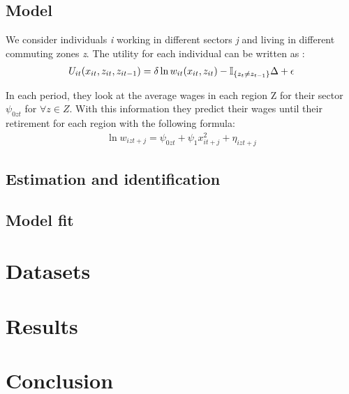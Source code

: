 \documentclass[12pt]{article}
\begin{document}
    \subsection*{Model}

    We consider individuals \textit{i} working in different sectors \textit{j} and living in different commuting
    zones \textit{z}.
    The utility for each individual can be written as :
    \begin{equation}\label{eq:utility function}
    \begin{aligned}
    U_{i t}(x_{i t}, z_{i t}, z_{i t-1}) =  & \hspace{1mm} \delta \ln w_{i t}(x_{i t}, z_{i t})- \mathbb{I}_{\{z_{t} \neq z_{t-1}\}}\Delta + \epsilon  \\
    \end{aligned}
    \end{equation}

    In each period, they look at the average wages in each region Z for their sector $\psi_{0 z t}$ for $\forall z
    \in Z$.
    With this information they predict their wages until their retirement for each region with the following formula:\\
    \begin{equation}\label{eq:forcasting earning function}
    \begin{aligned}
    \ln w_{i z t+j}=\psi_{0 z t}+\psi_1 x_{i t+j}^{2}+\eta_{i z t+j}
    \end{aligned}
    \end{equation}



    \subsection*{Estimation and identification}
    \subsection*{Model fit}


    \section{Datasets}\label{sec:datasets}


    \section{Results}\label{sec:results}


    \section{Conclusion}\label{sec:conclusion}

    \newpage
    {
        
        
    }
\end{document}
